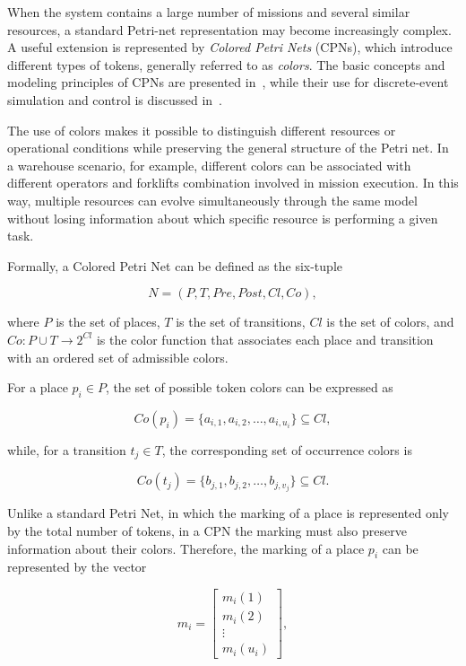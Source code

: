 When the system contains a large number of missions and several similar resources,
a standard Petri-net representation may become increasingly complex. A useful
extension is represented by \textit{Colored Petri Nets} (CPNs), which introduce
different types of tokens, generally referred to as \textit{colors}. The basic
concepts and modeling principles of CPNs are presented
in~\cite{jensen1997coloured}, while their use for discrete-event simulation
and control is discussed in~\cite{basile2007pnetlab}.

The use of colors makes it possible to distinguish different resources or
operational conditions while preserving the general structure of the Petri net.
In a warehouse scenario, for example, different colors can be associated with
different operators and forklifts combination involved in mission execution.
In this way, multiple resources can evolve simultaneously through the same model
without losing information about which specific resource is performing a given
task.

Formally, a Colored Petri Net can be defined as the six-tuple

\[
N=(P,T,Pre,Post,Cl,Co),
\]

\noindent where $P$ is the set of places, $T$ is the set of transitions, $Cl$ is the set
of colors, and $Co : P \cup T \rightarrow 2^{Cl}$ is the color function that associates each place and transition with an ordered
set of admissible colors.

For a place $p_i \in P$, the set of possible token colors can be expressed as

\begin{equation}
	Co(p_i)=\{a_{i,1},a_{i,2},\dots,a_{i,u_i}\}\subseteq Cl,
\end{equation}

\noindent while, for a transition $t_j \in T$, the corresponding set of occurrence
colors is

\begin{equation}
	Co(t_j)=\{b_{j,1},b_{j,2},\dots,b_{j,v_j}\}\subseteq Cl.
\end{equation}

\noindent Unlike a standard Petri Net, in which the marking of a place is represented only
by the total number of tokens, in a CPN the marking must also preserve information
about their colors. Therefore, the marking of a place $p_i$ can be represented
by the vector

\[
m_i =
\begin{bmatrix}
	m_i(1)\\
	m_i(2)\\
	\vdots\\
	m_i(u_i)
\end{bmatrix},
\]

